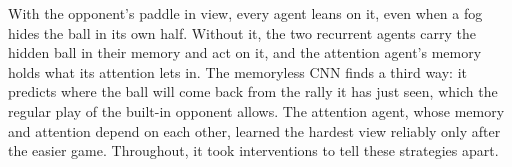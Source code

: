 \documentclass[11pt]{article}
\begin{document}
With the opponent's paddle in view, every agent leans on it, even when a fog hides the ball in its own half.
Without it, the two recurrent agents carry the hidden ball in their memory and act on it, and the attention
agent's memory holds what its attention lets in. The memoryless CNN finds a third way: it predicts where the
ball will come back from the rally it has just seen, which the regular play of the built-in opponent allows.
The attention agent, whose memory and attention depend on each other, learned the hardest view reliably only
after the easier game. Throughout, it took interventions to tell these strategies apart.



\end{document}
